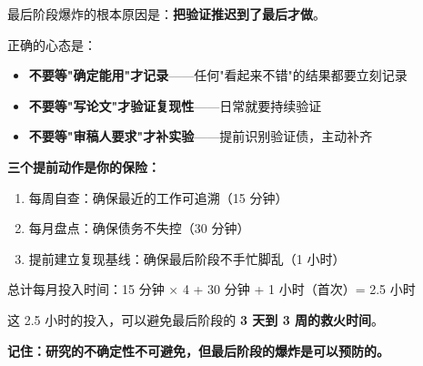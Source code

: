 最后阶段爆炸的根本原因是：\textbf{把验证推迟到了最后才做}。

正确的心态是：
\begin{itemize}
  \item \textbf{不要等"确定能用"才记录}——任何"看起来不错"的结果都要立刻记录
  \item \textbf{不要等"写论文"才验证复现性}——日常就要持续验证
  \item \textbf{不要等"审稿人要求"才补实验}——提前识别验证债，主动补齐
\end{itemize}

\textbf{三个提前动作是你的保险：}
\begin{enumerate}
  \item 每周自查：确保最近的工作可追溯（15 分钟）
  \item 每月盘点：确保债务不失控（30 分钟）
  \item 提前建立复现基线：确保最后阶段不手忙脚乱（1 小时）
\end{enumerate}

总计每月投入时间：15 分钟 × 4 + 30 分钟 + 1 小时（首次）= 2.5 小时

这 2.5 小时的投入，可以避免最后阶段的 \textbf{3 天到 3 周的救火时间}。

\textbf{记住：研究的不确定性不可避免，但最后阶段的爆炸是可以预防的。}
